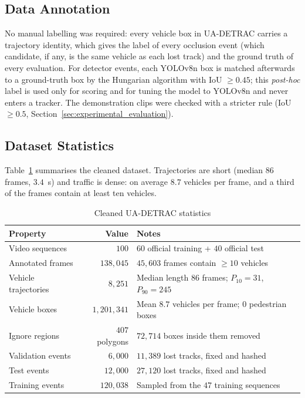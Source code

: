 \subsection{Data Annotation}
\label{sec:data_annotation}

No manual labelling was required: every vehicle box in UA-DETRAC carries a trajectory identity, which gives the label of every occlusion event (which candidate, if any, is the same vehicle as each lost track) and the ground truth of every evaluation. For detector events, each YOLOv8n box is matched afterwards to a ground-truth box by the Hungarian algorithm with IoU $\ge 0.45$; this \emph{post-hoc} label is used only for scoring and for tuning the model to YOLOv8n and never enters a tracker. The demonstration clips were checked with a stricter rule (IoU $\ge 0.5$, Section~\ref{sec:experimental_evaluation}).

\subsection{Dataset Statistics}
\label{sec:dataset_stats}

Table~\ref{tab:dataset_stats} summarises the cleaned dataset. Trajectories are short (median $86$ frames, $3.4$~s) and traffic is dense: on average $8.7$ vehicles per frame, and a third of the frames contain at least ten vehicles.

\begin{table}[H]
    \centering
    \caption{Cleaned UA-DETRAC statistics}
    \label{tab:dataset_stats}
    \begin{tabularx}{\textwidth}{l r X}
        \toprule
        \textbf{Property} & \textbf{Value} & \textbf{Notes} \\
        \midrule
        Video sequences & $100$ & $60$ official training + $40$ official test \\
        Annotated frames & $138{,}045$ & $45{,}603$ frames contain $\ge 10$ vehicles \\
        Vehicle trajectories & $8{,}251$ & Median length $86$ frames; $P_{10}=31$, $P_{90}=245$ \\
        Vehicle boxes & $1{,}201{,}341$ & Mean $8.7$ vehicles per frame; $0$ pedestrian boxes \\
        Ignore regions & $407$ polygons & $72{,}714$ boxes inside them removed \\
        Validation events & $6{,}000$ & $11{,}389$ lost tracks, fixed and hashed \\
        Test events & $12{,}000$ & $27{,}120$ lost tracks, fixed and hashed \\
        Training events & $120{,}038$ & Sampled from the $47$ training sequences \\
        \bottomrule
    \end{tabularx}
\end{table}

